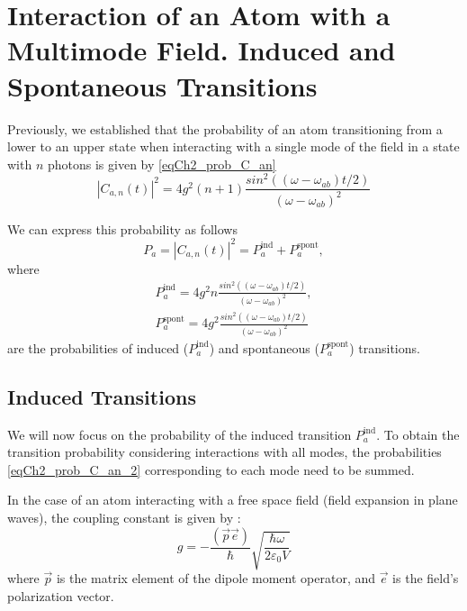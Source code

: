 \section{Interaction of an Atom with a Multimode Field. Induced and Spontaneous Transitions}

Previously, we established that the probability of an atom transitioning from a lower to an upper state when interacting with a single mode of the field in a state with $n$ photons is given by \eqref{eqCh2_prob_C_an} 
\begin{equation}
\left|C_{a,n}\left(t\right)\right|^2 = 4 g^2 \left(n+1\right)
  \frac{sin^2\left(\left(\omega - 
  \omega_{ab}\right)t/2\right)} {\left(\omega - 
  \omega_{ab}\right)^2}
  \nonumber
\end{equation}

We can express this probability as follows
\begin{equation}
  P_a = \left|C_{a,n}\left(t\right)\right|^2 =
  P_a^{\text{ind}} + P_a^{\text{spont}},
  \label{eqCh2_prob_C_an_2_1}
\end{equation}
where
\begin{eqnarray}
  P_a^{\text{ind}} = 4 g^2 n
  \frac{sin^2\left(\left(\omega - 
  \omega_{ab}\right)t/2\right)} {\left(\omega - 
    \omega_{ab}\right)^2},
  \nonumber \\
  P_a^{\text{spont}} = 4 g^2 
  \frac{sin^2\left(\left(\omega - 
  \omega_{ab}\right)t/2\right)} {\left(\omega - 
  \omega_{ab}\right)^2}
  \label{eqCh2_prob_C_an_2}
\end{eqnarray}
are the probabilities of induced ($P_a^{\text{ind}}$) and spontaneous ($P_a^{\text{spont}}$) transitions.

\subsection{Induced Transitions}

We will now focus on the probability of the induced transition $P_a^{\text{ind}}$. To obtain the transition probability considering interactions with all modes, the probabilities \eqref{eqCh2_prob_C_an_2} corresponding to each mode need to be summed. 

In the case of an atom interacting with a free space field (field expansion in plane waves), the coupling constant is given by \cite{bLuisell1972}: 
\begin{equation}
g = - \frac{\left(\vec{p}\vec{e}\right)}{\hbar}
\sqrt{\frac{\hbar \omega}{2 \varepsilon_0 V}}
\end{equation}
where $\vec{p}$ is the matrix element of the dipole moment operator, and $\vec{e}$ is the field's polarization vector.

